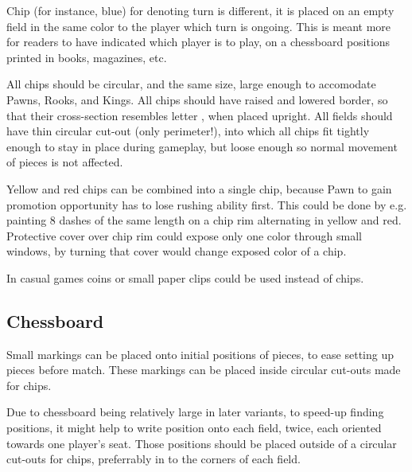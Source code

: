 Chip (for instance, blue) for denoting turn is different, it is placed on an
empty field in the same color to the player which turn is ongoing. This is
meant more for readers to have indicated which player is to play, on a
chessboard positions printed in books, magazines, etc.

All chips should be circular, and the same size, large enough to accomodate
Pawns, Rooks, and Kings. All chips should have raised and lowered border, so
that their cross-section resembles letter , when placed upright.
All fields should have thin circular cut-out (only perimeter!), into which
all chips fit tightly enough to stay in place during gameplay, but loose
enough so normal movement of pieces is not affected.

Yellow and red chips can be combined into a single chip, because Pawn to gain
promotion opportunity has to lose rushing ability first. This could be done by
e.g. painting 8 dashes of the same length on a chip rim alternating in yellow
and red. Protective cover over chip rim could expose only one color through
small windows, by turning that cover would change exposed color of a chip.

In casual games coins or small paper clips could be used instead of chips.

\subsection*{Chessboard}
\label{sec:Remarks/Chessboard}

Small markings can be placed onto initial positions of pieces, to ease setting
up pieces before match. These markings can be placed inside circular cut-outs
made for chips.

Due to chessboard being relatively large in later variants, to speed-up finding
positions, it might help to write  position onto each field, twice,
each oriented towards one player's seat. Those  positions should be
placed outside of a circular cut-outs for chips, preferrably in to the corners
of each field.

\clearpage %
